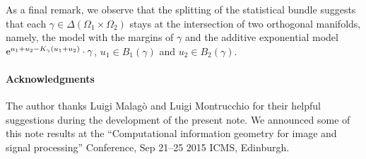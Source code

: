 \documentclass[runningheads]{llncs}
\begin{document}
As a final remark, we observe that the splitting of the statistical bundle suggests that each $\gamma \in \Delta(\Omega_1\times\Omega_2)$ stays at the intersection of two orthogonal manifolds, namely, the  model with the margins of $\gamma$ and the additive exponential model $\mathrm{e}^{u_1+u_2 - K_\gamma(u_1 + u_2)} \cdot \gamma$, $u_1 \in B_1(\gamma)$ and $u_2 \in B_2(\gamma)$.

\paragraph{Acknowledgments}
The author thanks Luigi Malag\`o and Luigi Montrucchio for their helpful suggestions during the development of the present note. We announced some of this note results at the ``Computational information geometry for image and signal processing'' Conference, Sep 21--25 2015 ICMS, Edinburgh.

%


%
\end{document}
